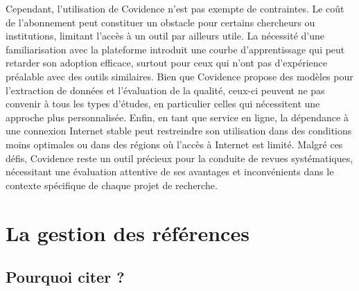 \documentclass[
  letterpaper,
]{scrbook}
\begin{document}
Cependant, l'utilisation de Covidence n'est pas exempte de contraintes.
Le coût de l'abonnement peut constituer un obstacle pour certains
chercheurs ou institutions, limitant l'accès à un outil par ailleurs
utile. La nécessité d'une familiarisation avec la plateforme introduit
une courbe d'apprentissage qui peut retarder son adoption efficace,
surtout pour ceux qui n'ont pas d'expérience préalable avec des outils
similaires. Bien que Covidence propose des modèles pour l'extraction de
données et l'évaluation de la qualité, ceux-ci peuvent ne pas convenir à
tous les types d'études, en particulier celles qui nécessitent une
approche plus personnalisée. Enfin, en tant que service en ligne, la
dépendance à une connexion Internet stable peut restreindre son
utilisation dans des conditions moins optimales ou dans des régions où
l'accès à Internet est limité. Malgré ces défis, Covidence reste un
outil précieux pour la conduite de revues systématiques, nécessitant une
évaluation attentive de ses avantages et inconvénients dans le contexte
spécifique de chaque projet de recherche.


\hypertarget{sec-chap6}{%
\chapter{La gestion des références}\label{sec-chap6}}

\hypertarget{pourquoi-citer}{%
\section{Pourquoi citer ?}\label{pourquoi-citer}}
\end{document}
